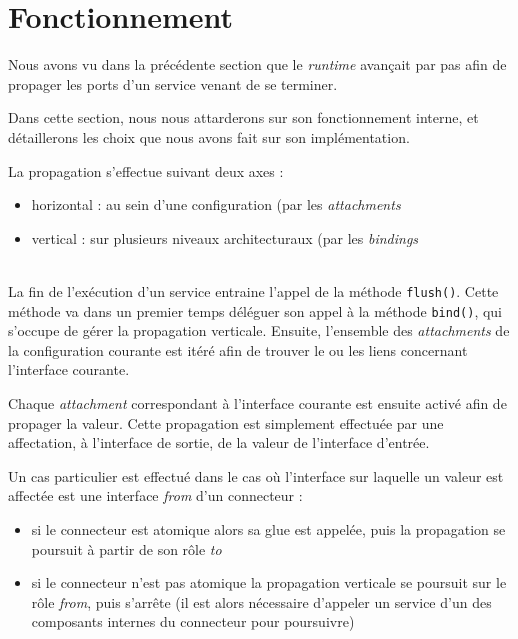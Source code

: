 	\section{Fonctionnement}
    
    	Nous avons vu dans la précédente section que le \emph{runtime} avançait par pas afin de propager les ports d'un service venant de se terminer.
        
        Dans cette section, nous nous attarderons sur son fonctionnement interne, et détaillerons les choix que nous avons fait sur son implémentation.
        \newline
        
        La propagation s'effectue suivant deux axes :
        \begin{itemize}
        	\item horizontal : au sein d'une configuration (par les \emph{attachments}
            \item vertical : sur plusieurs niveaux architecturaux (par les \emph{bindings}
        \end{itemize}
        ~\\
        
        La fin de l'exécution d'un service entraine l'appel de la méthode \lstinline{flush()}. Cette méthode va dans un premier temps déléguer son appel à la méthode \lstinline{bind()}, qui s'occupe de gérer la propagation verticale. Ensuite, l'ensemble des \emph{attachments} de la configuration courante est itéré afin de trouver le ou les liens concernant l'interface courante.
        
        Chaque \emph{attachment} correspondant à l'interface courante est ensuite activé afin de propager la valeur. Cette propagation est simplement effectuée par une affectation, à l'interface de sortie, de la valeur de l'interface d'entrée.
        \newline
        
        Un cas particulier est effectué dans le cas où l'interface sur laquelle un valeur est affectée est une interface \emph{from} d'un connecteur : 
        \begin{itemize}
        	\item si le connecteur est atomique alors sa glue est appelée, puis la propagation se poursuit à partir de son rôle \emph{to}
            \item si le connecteur n'est pas atomique la propagation verticale se poursuit sur le rôle \emph{from}, puis s'arrête (il est alors nécessaire d'appeler un service d'un des composants internes du connecteur pour poursuivre)
        \end{itemize}
        ~\\
        
